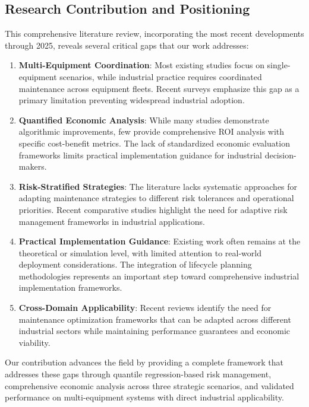 \documentclass[twocolumn]{article}
\begin{document}
\subsection{Research Contribution and Positioning}

This comprehensive literature review, incorporating the most recent developments through 2025, reveals several critical gaps that our work addresses:

\begin{enumerate}
\item \textbf{Multi-Equipment Coordination}: Most existing studies focus on single-equipment scenarios, while industrial practice requires coordinated maintenance across equipment fleets. Recent surveys\cite{tsallis2025appwise,siraskar2023reinforcement} emphasize this gap as a primary limitation preventing widespread industrial adoption.
\item \textbf{Quantified Economic Analysis}: While many studies demonstrate algorithmic improvements, few provide comprehensive ROI analysis with specific cost-benefit metrics. The lack of standardized economic evaluation frameworks\cite{levin2024enhancing} limits practical implementation guidance for industrial decision-makers.
\item \textbf{Risk-Stratified Strategies}: The literature lacks systematic approaches for adapting maintenance strategies to different risk tolerances and operational priorities. Recent comparative studies\cite{ieee2024deeprl} highlight the need for adaptive risk management frameworks in industrial applications.
\item \textbf{Practical Implementation Guidance}: Existing work often remains at the theoretical or simulation level, with limited attention to real-world deployment considerations. The integration of lifecycle planning methodologies\cite{latifi2021deeprl} represents an important step toward comprehensive industrial implementation frameworks.
\item \textbf{Cross-Domain Applicability}: Recent reviews\cite{tsallis2025appwise} identify the need for maintenance optimization frameworks that can be adapted across different industrial sectors while maintaining performance guarantees and economic viability.
\end{enumerate}

Our contribution advances the field by providing a complete framework that addresses these gaps through quantile regression-based risk management, comprehensive economic analysis across three strategic scenarios, and validated performance on multi-equipment systems with direct industrial applicability.
\end{document}
